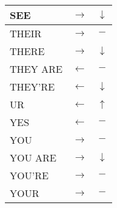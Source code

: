 \documentclass[]{article}
\begin{document}
\begin{tabular}{|l|c|c|}
\hline \rule[-2ex]{0pt}{5.5ex} SEE			&$\rightarrow$	&$\downarrow $\\ 
\hline \rule[-2ex]{0pt}{5.5ex} THEIR		&$\rightarrow$	&$- $\\ 
\hline \rule[-2ex]{0pt}{5.5ex} THERE		&$\rightarrow$	&$\downarrow $\\ 
\hline \rule[-2ex]{0pt}{5.5ex} THEY ARE		&$\leftarrow$	&$- $\\ 
\hline \rule[-2ex]{0pt}{5.5ex} THEY'RE		&$\leftarrow$	&$\downarrow $\\ 
\hline \rule[-2ex]{0pt}{5.5ex} UR			&$\leftarrow$	&$\uparrow $\\	
\hline \rule[-2ex]{0pt}{5.5ex} YES			&$\leftarrow$	&$- $\\ 
\hline \rule[-2ex]{0pt}{5.5ex} YOU			&$\rightarrow$	&$- $\\ 
\hline \rule[-2ex]{0pt}{5.5ex} YOU ARE		&$\rightarrow$	&$\downarrow $\\	
\hline \rule[-2ex]{0pt}{5.5ex} YOU'RE		&$\rightarrow$	&$- $\\	
\hline \rule[-2ex]{0pt}{5.5ex} YOUR			&$\rightarrow$	&$- $\\			
\hline
\end{tabular} 
\quad
\end{document}
